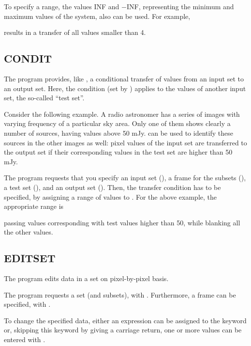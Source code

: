To specify a range, the values INF and $-$INF, representing the minimum
and maximum values of the system, also can be used.  For example,


results in a transfer of all values smaller than 4.

\subsection*{CONDIT}

The program  provides, like , a
conditional transfer of values from an input set to an output set. 
Here, the condition (set by ) applies to the values of
another input set, the so-called ``test set''. 

Consider the following example.  A radio astronomer has a series of
images with varying frequency of a particular sky area.  Only one of
them shows clearly a number of sources, having values above 50 mJy. 
 can be used to identify these sources in the other
images as well: pixel values of the input set are transferred to the
output set if their corresponding values in the test set are higher than
50 mJy. 

The program requests that you specify an input set (), a frame
for the subsets (), a test set (), and an
output set ().  Then, the transfer condition has to be
specified, by assigning a range of values to .  For the
above example, the appropriate range is


passing values corresponding with test values higher than 50, while
blanking all the other values. 

\subsection*{EDITSET}

The program  edits data in a set on pixel-by-pixel basis.

The program requests a set (and subsets), with . 
Furthermore, a frame can be specified, with . 

To change the specified data, either an expression can be assigned to
the keyword  or, skipping this keyword by giving a
carriage return, one or more values can be entered with . 

